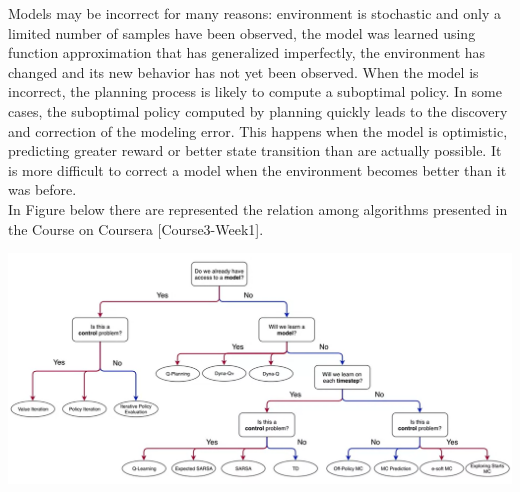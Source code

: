 \documentclass[10pt,landscape]{article}
\begin{document}
\begin{multicols}{3}
Models may be incorrect for many reasons: environment is stochastic and only a limited number of samples have been observed, the model was learned using function approximation that has generalized imperfectly, the environment has changed and its new behavior has not yet been observed. 
When the model is incorrect, the planning process is likely to compute a suboptimal policy. In some cases, the suboptimal policy computed by planning quickly leads to the discovery and correction of the modeling error. This happens when the model is optimistic, predicting greater reward or better state transition than are actually possible. It is more difficult to correct a model when the environment becomes better than it was before.\\
In Figure below there are represented the relation among algorithms presented in the Course on Coursera [Course3-Week1].\\
\begin{center}
\includegraphics[width=1\linewidth]{./images/Tabular_Value_Function.png}
\end{center}
\end{multicols}

\newpage
\end{document}
